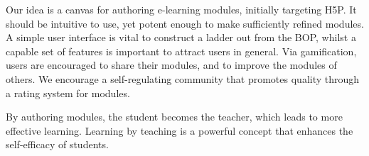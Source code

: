 Our idea is a canvas for authoring e-learning modules, initially targeting 
H5P. It should be intuitive to use, yet potent enough to make sufficiently 
refined modules. A simple user interface is vital to construct a ladder out 
from the BOP, whilst a capable set of features is important to attract users 
in general. Via gamification, users are encouraged to share their modules, and 
to improve the modules of others. We encourage a self-regulating community 
that promotes quality through a rating system for modules.

By authoring modules, the student becomes the teacher, which leads to more 
effective learning. Learning by teaching is a powerful concept that enhances 
the self-efficacy of students.
